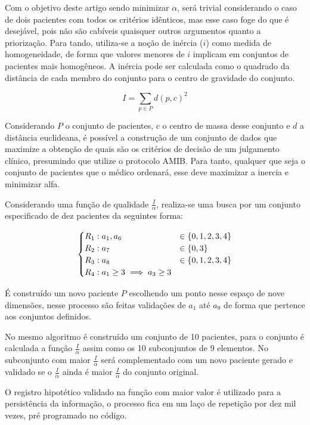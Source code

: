 \documentclass[12pt]{article}
\begin{document}
Com o objetivo deste artigo sendo minimizar $\alpha$, será trivial considerando o caso de dois pacientes com todos os critérios idênticos, mas esse caso foge do que é desejável, pois não são cabíveis quaisquer outros argumentos quanto a priorização.
Para tando, utiliza-se a noção de inércia ($i$) como medida de homogeneidade, de forma que valores menores de $i$ implicam em conjuntos de pacientes mais homogêneos.
A inércia pode ser calculada como o quadrado da distância de cada membro do conjunto para o centro de gravidade do conjunto.

\[
I = \sum_{p \in P}d(p, c)^2
\] 

Considerando $P$ o conjunto de pacientes, $c$ o centro de massa desse conjunto e $d$ a distância euclideana, é possível a construção de um conjunto de dados que maximize a obtenção de quais são os critérios de decisão de um julgamento clínico, presumindo que utilize o protocolo AMIB. Para tanto, qualquer que seja o conjunto de pacientes que o médico ordenará, esse deve maximizar a inercia e minimizar alfa.

Considerando uma função de qualidade $\frac{I}{\alpha}$, realiza-se uma busca por um conjunto especificado de dez pacientes da seguintes forma:

\[
\begin{split}
    \begin{cases}
    R_1: a_1 , a_6 &\in \{0, 1, 2, 3, 4\} \\
    R_2: a_7 &\in \{0, 3\} \\
    R_3: a_8 &\in \{0, 1, 2, 3, 4\} \\
    R_4: a_1 \ge 3 \implies a_3 \ge 3 \\
    \end{cases}
\end{split}
\]

É construído um novo paciente $P$ escolhendo um ponto nesse espaço de nove dimensões, nesse processo são feitas validações de $a_1$ até $a_9$ de forma que pertence aos conjuntos definidos.

No mesmo algoritmo é construído um conjunto de 10 pacientes, para o conjunto é calculada a função $\frac{I}{\alpha}$ assim como os 10 subconjuntos de 9 elementos.
No subconjunto com maior $\frac{I}{\alpha}$ será complementado com um novo paciente gerado e validado se o $\frac{I}{\alpha}$ ainda é maior $\frac{I}{\alpha}$ do conjunto original.

O registro hipotético validado na função com maior valor é utilizado para a persistência da informação, o processo fica em um laço de repetição por dez mil vezes, pré programado no código.
\end{document}
